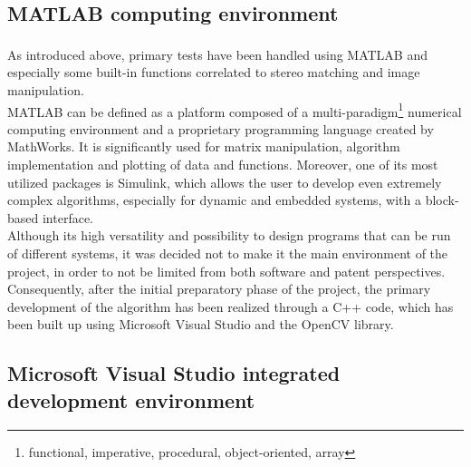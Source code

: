 \subsection{MATLAB computing environment}
\label{subsection:matlab-env}
As introduced above, primary tests have been handled using MATLAB\textsuperscript{\textregistered} and especially some built-in functions correlated to stereo matching and image manipulation.\\
MATLAB can be defined as a platform composed of a multi-paradigm\footnote{functional, imperative, procedural, object-oriented, array} numerical computing environment and a proprietary programming language created by MathWorks.
It is significantly used for matrix manipulation, algorithm implementation and plotting of data and functions.
Moreover, one of its most utilized packages is Simulink, which allows the user to develop even extremely complex algorithms, especially for dynamic and embedded systems, with a block-based interface. \\
Although its high versatility and possibility to design programs that can be run of different systems, it was decided not to make it the main environment of the project, in order to not be limited from both software and patent perspectives.\\
Consequently, after the initial preparatory phase of the project, the primary development of the algorithm has been realized through a C++ code, which has been built up using Microsoft Visual Studio and the OpenCV library. 

\subsection{Microsoft Visual Studio integrated development environment}
\label{subsection:visual-studio-env}

